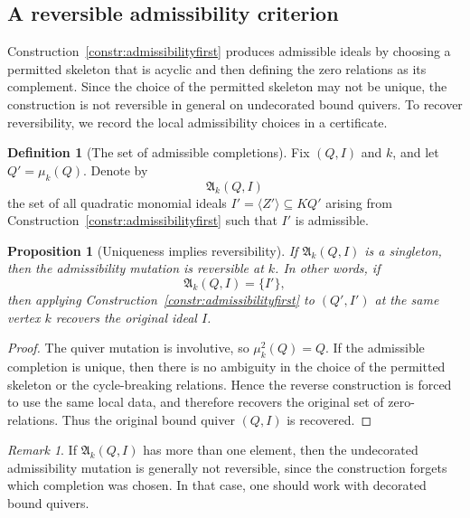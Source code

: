 \documentclass[11pt]{article}
\theoremstyle{plain}
\newtheorem{proposition}[theorem]{Proposition}
\theoremstyle{definition}
\newtheorem{definition}[theorem]{Definition}
\theoremstyle{remark}
\newtheorem{remark}[theorem]{Remark}
\begin{document}
\subsection{A reversible admissibility criterion}\label{subsec:reversible-admissibility}

Construction~\ref{constr:admissibilityfirst} produces admissible ideals by
choosing a permitted skeleton that is acyclic and then defining the zero
relations as its complement.  Since the choice of the permitted skeleton may
not be unique, the construction is not reversible in general on undecorated
bound quivers.  To recover reversibility, we record the local admissibility
choices in a certificate.

\begin{definition}[The set of admissible completions]
Fix \((Q,I)\) and \(k\), and let \(Q'=\mu_k(Q)\).  Denote by
\[
\mathfrak A_k(Q,I)
\]
the set of all quadratic monomial ideals \(I'=\langle Z'\rangle\subseteq KQ'\)
arising from Construction~\ref{constr:admissibilityfirst} such that \(I'\) is
admissible.
\end{definition}

\begin{proposition}[Uniqueness implies reversibility]\label{prop:unique-admissibility-reversible}
If \(\mathfrak A_k(Q,I)\) is a singleton, then the admissibility mutation is
reversible at \(k\).  In other words, if
\[
\mathfrak A_k(Q,I)=\{I'\},
\]
then applying Construction~\ref{constr:admissibilityfirst} to \((Q',I')\) at
the same vertex \(k\) recovers the original ideal \(I\).
\end{proposition}

\begin{proof}
The quiver mutation is involutive, so \(\mu_k^2(Q)=Q\).  If the admissible
completion is unique, then there is no ambiguity in the choice of the
permitted skeleton or the cycle-breaking relations.  Hence the reverse
construction is forced to use the same local data, and therefore recovers the
original set of zero-relations.  Thus the original bound quiver \((Q,I)\) is
recovered.
\end{proof}

\begin{remark}
If \(\mathfrak A_k(Q,I)\) has more than one element, then the undecorated
admissibility mutation is generally not reversible, since the construction
forgets which completion was chosen.  In that case, one should work with
decorated bound quivers.
\end{remark}
\end{document}
